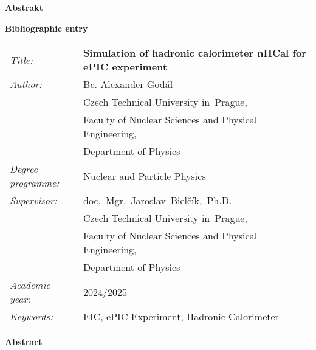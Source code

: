 \documentclass[a4paper, 12pt, oneside]{book}
\newcommand{\cvuten}{Czech Technical University in~Prague}
\newcommand{\fjfien}{Faculty of Nuclear Sciences and Physical Engineering}
\newcommand{\kfen}{Department of Physics}
\newcommand{\oboren}{Nuclear and Particle Physics}
\newcommand{\abstraktcz}{}
\newcommand{\nazeven}{Simulation of hadronic calorimeter nHCal for ePIC experiment} %
\newcommand{\klicovaslovaen}{EIC, ePIC Experiment, Hadronic Calorimeter}
\newcommand{\abstrakten}{}
\newcommand{\autor}{Bc. Alexander Godál}
\newcommand{\vedouci}{doc.~Mgr.~Jaroslav~Bielčík,~Ph.D.}
\newcommand{\konzultant}{Ing.~Alexandr~Prozorov,~Ph.D.}
\newcommand{\akrok}{2024/2025}
\begin{document}
\vspace{10mm}

{\bf Abstrakt}
\vspace{5mm}\\
\indent \abstraktcz





\newpage
\thispagestyle{empty}

{\bf Bibliographic entry}

\vspace{5mm} 

\begin{tabular}{p{100pt}l}
  {\em Title:} & {\bf \footnotesize\nazeven} \\
  {\em Author:} & \autor \\
   &\cvuten, \\   
   &\fjfien,\\
   &\kfen\\ 
  {\em Degree programme:} & \oboren\\ 
  {\em Supervisor:} & \vedouci \\ 
   &\cvuten, \\   
   &\fjfien,\\
   &\kfen\\ 
  {\em Academic year:} & \akrok\\
  {\em Keywords:} & \klicovaslovaen\\

\end{tabular}

\vspace{10mm}

{\bf Abstract}
\vspace{5mm}\\
\indent \abstrakten







\tableofcontents






% 



%
\end{document}
